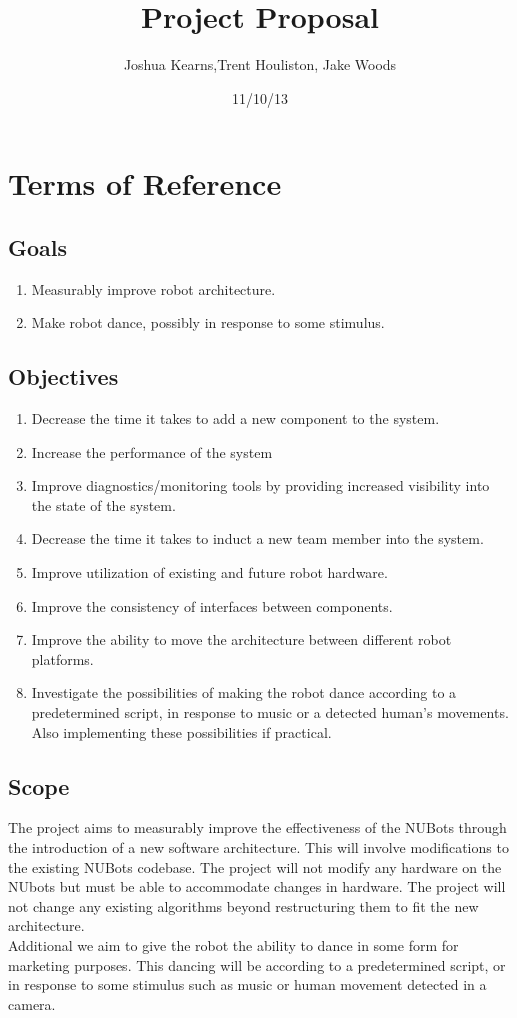 \documentclass[a4paper]{article}
\title{Project Proposal}
\author{Joshua Kearns,Trent Houliston, Jake Woods}
\date{11/10/13}
\begin{document}
	\maketitle
	
	\clearpage
	\tableofcontents
	\clearpage

	\section{Terms of Reference}
		\subsection {Goals}
			\begin{enumerate}
				\item Measurably improve robot architecture.
				\item Make robot dance, possibly in response to some stimulus.
			\end{enumerate}
		\subsection {Objectives}
			\begin{enumerate}
				\item Decrease the time it takes to add a new component to the system.
				\item Increase the performance of the system
				\item Improve diagnostics/monitoring tools by providing increased visibility into the state of the system.
				\item Decrease the time it takes to induct a new team member into the system.
				\item Improve utilization of existing and future robot hardware.
				\item Improve the consistency of interfaces between components.
				\item Improve the ability to move the architecture between different robot platforms.
				\item Investigate the possibilities of making the robot dance according to a predetermined script, in response to music or a detected human’s movements. Also implementing these possibilities if practical.
			\end{enumerate}
		\subsection {Scope}
			The project aims to measurably improve the effectiveness of the NUBots through the introduction of a new software architecture. This will involve modifications to the existing NUBots codebase. The project will not modify any hardware on the NUbots but must be able to accommodate changes in hardware. The project will not change any existing algorithms beyond restructuring them to fit the new architecture.
			\\Additional we aim to give the robot the ability to dance in some form for marketing purposes. This dancing will be according to a predetermined script, or in response to some stimulus such as music or human movement detected in a camera.
\end{document}
